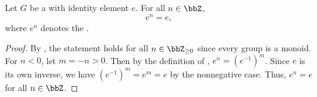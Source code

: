 \begin{lemma} \label{lemma:power_of_identity_in_a_group_by_any_integer_is_identity}
    Let $G$ be a  with identity element $e$. For all $n \in \bbZ$,
    $$e^n = e,$$
    where $e^n$ denotes the .
\end{lemma}
\begin{proof}
    By , the statement holds for all $n \in \bbZ_{\ge 0}$ since every group is a monoid. For $n < 0$, let $m = -n > 0$. Then by the definition of , $e^n = (e^{-1})^m$. Since $e$ is its own inverse, we have $(e^{-1})^m = e^m = e$ by the nonnegative case. Thus, $e^n = e$ for all $n \in \bbZ$.
\end{proof}